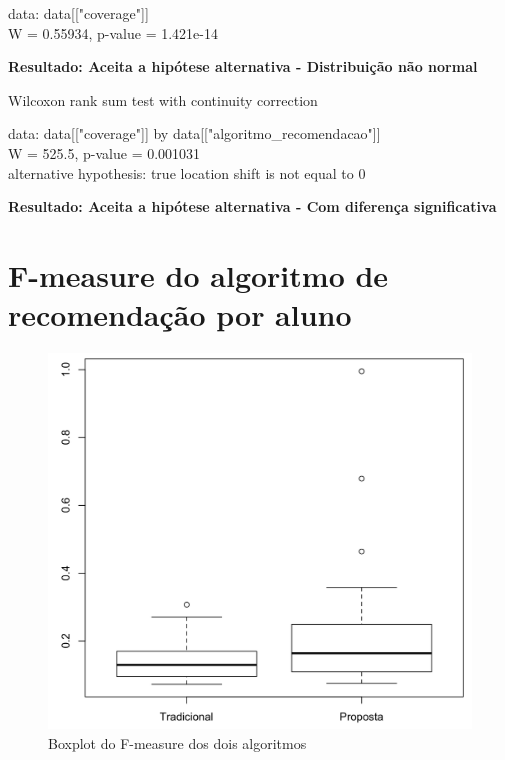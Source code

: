\noindent
data:  data[["coverage"]]\\
W = 0.55934, p-value = 1.421e-14

\noindent
\textbf{Resultado: Aceita a hipótese alternativa - Distribuição não normal}

  Wilcoxon rank sum test with continuity correction

\noindent
data:  data[["coverage"]] by data[["algoritmo\_recomendacao"]]\\
W = 525.5, p-value = 0.001031\\
alternative hypothesis: true location shift is not equal to 0

\noindent
\textbf{Resultado: Aceita a hipótese alternativa - Com diferença significativa}

\newpage
\section{F-measure do algoritmo de recomendação por aluno}

\begin{figure}[htb]
  \caption{\label{fig:media-harmonica-boxplot}Boxplot do F-measure dos dois algoritmos}
  \begin{center}
      \includegraphics[scale=0.4]{./Figuras/media-harmonica-boxplot.png}
  \end{center}
\end{figure}

